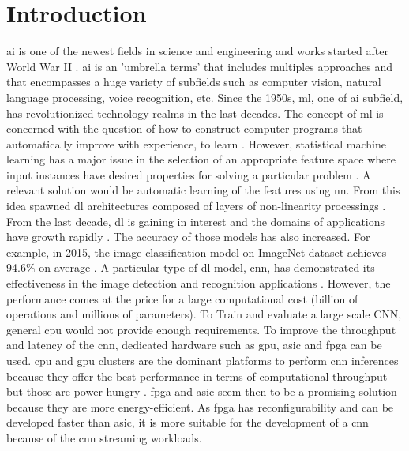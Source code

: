 \chapter{Introduction} \label{chap:intr}
\acrfull{ai} is one of the newest fields in science and engineering and works started after World War II \cite{russell_artificial_2009}. \acrshort{ai} is an 'umbrella terms' that includes multiples approaches and that encompasses a huge variety of subfields such as computer vision, natural language processing, voice recognition, etc.
Since the 1950s, \acrfull{ml}, one of \acrshort{ai} subfield, has revolutionized technology realms in the last decades. The concept of \acrshort{ml} is concerned with the question of how to construct computer programs that automatically improve with experience, to learn \cite{mitchell_machine_1997}.
However, statistical machine learning has a major issue in the selection of an appropriate feature space where input instances have desired properties for solving a particular problem \cite{arnold_introduction_2011}. A relevant solution would be automatic learning of the features using \acrfull{nn}. From this idea spawned \acrfull{dl} architectures composed of layers of non-linearity processings \cite{alom_history_2018}. From the last decade, \acrshort{dl} is gaining in interest and the domains of applications have growth rapidly \cite{wason_deep_2018}. The accuracy of those models has also increased. For example, in 2015, the image classification model on ImageNet dataset achieves 94.6\% on average \cite{russakovsky_imagenet_2015}.\newline \newline
A particular type of \acrshort{dl} model, \acrfull{cnn}, has demonstrated its effectiveness in the image detection and recognition applications \cite{shawahna_fpga-based_2019}. However, the performance comes at the price for a large computational cost (billion of operations and millions of parameters). To Train and evaluate a large scale CNN, general \acrshort{cpu} would not provide enough requirements. To improve the throughput and latency of the \acrshort{cnn}, dedicated hardware such as \acrfull{gpu}, \acrfull{asic} and \acrfull{fpga} can be used. \acrshort{cpu} and \acrshort{gpu} clusters are the dominant platforms to perform \acrshort{cnn} inferences because they offer the best performance in terms of computational throughput but those are power-hungry \cite{liu_uniform_2019}.
\acrshort{fpga} and \acrshort{asic} seem then to be a promising solution because they are more energy-efficient. As \acrshort{fpga} has reconfigurability and can be developed faster than \acrshort{asic}, it is more suitable for the development of a \acrshort{cnn} because of the \acrshort{cnn} streaming workloads. \newline \newline

